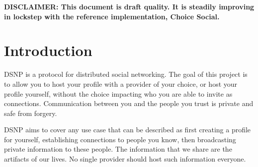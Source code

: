 \documentclass[letterpaper,11pt,oneside]{article}
\begin{document}
{\noindent\bf\large DISCLAIMER: This document is draft quality. It is steadily
improving in lockstep with the reference implementation, Choice Social.}

\newpage

\tableofcontents

%
%


%
%
%


\section{Introduction}

%
%
% 

DSNP is a protocol for distributed social networking. The goal of this project
is to allow you to host your profile with a provider of your choice, or host
your profile yourself, without the choice impacting who you are able to invite
as connections. Communication between you and the people you trust is private
and safe from forgery.

DSNP aims to cover any use case that can be described as first creating a
profile for yourself, establishing connections to people you know, then
broadcasting private information to these people. The information that we share
are the artifacts of our lives. No single provider should host such information
everyone.
\end{document}

